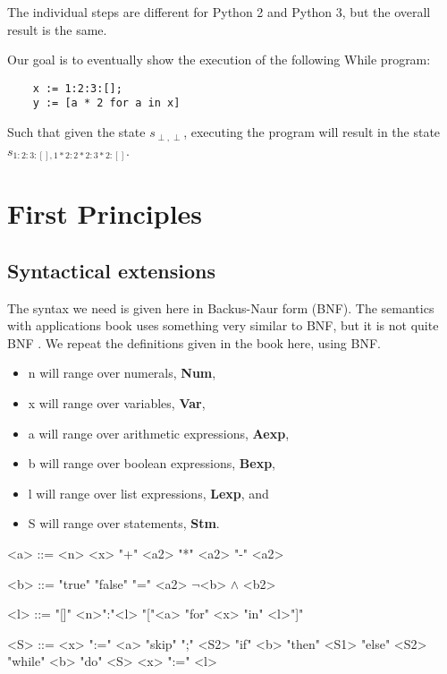 \documentclass[12pt]{article}
\newcommand{\metavar}[1]{\textlangle#1\textrangle}
\begin{document}
The individual steps are different for Python 2 and Python 3, but the overall result is the same.

Our goal is to eventually show the execution of the following While program:

\begin{lstlisting}
    x := 1:2:3:[];
    y := [a * 2 for a in x]
\end{lstlisting}

Such that given the state $s_{\perp, \perp}$, executing the program will result in the state $s_{1:2:3:[], 1*2:2*2:3*2:[]}$.

\section{First Principles}

\subsection{Syntactical extensions}

The syntax we need is given here in Backus-Naur form (BNF). The semantics with applications book uses something very similar to BNF, but it is not quite BNF \cite[section 1.2]{wiley}. We repeat the definitions given in the book here, using BNF.

\begin{itemize}
    \item \metavar{n} will range over numerals, \textbf{Num},
    \item \metavar{x} will range over variables, \textbf{Var},
    \item \metavar{a} will range over arithmetic expressions, \textbf{Aexp},
    \item \metavar{b} will range over boolean expressions, \textbf{Bexp},
    \item \metavar{l} will range over list expressions, \textbf{Lexp}, and
    \item \metavar{S} will range over statements, \textbf{Stm}.
\end{itemize}

\begin{grammar}
    <a> ::= <n>
    \alt <x>
     "+" <a2>
     "*" <a2>
     "-" <a2>

    <b> ::= "true"
    \alt "false"
     "=" <a2>
    \alt $\lnot$<b>
     $\land$ <b2>

    <l> ::= "[]"
    \alt <n>":"<l>
    \alt "["<a> "for" <x> "in" <l>"]"

    <S> ::= <x> ":=" <a>
    \alt "skip"
     ";" <S2>
    \alt "if" <b> "then" <S1> "else" <S2>
    \alt "while" <b> "do" <S>
    \alt <x> ":=" <l>
\end{grammar}
\end{document}
